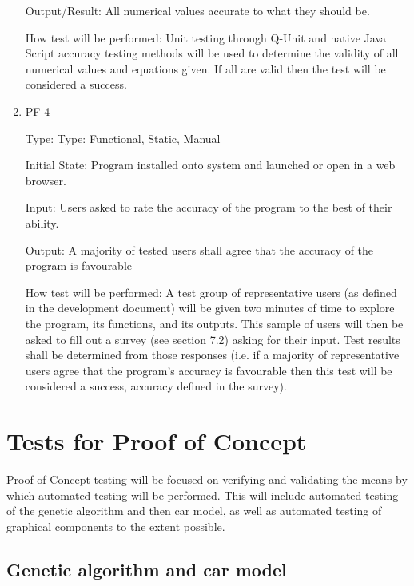 \documentclass[12pt, titlepage]{article}
\begin{document}
\begin{enumerate}
Output/Result: All numerical values accurate to what they should be.
					
How test will be performed: Unit testing through Q-Unit and native Java Script 
accuracy testing methods will be used to determine the validity of all numerical 
values and equations given. If all are valid then the test will be considered a 
success.


\item{PF-4\\}

Type: Type: Functional, Static, Manual
					
Initial State: Program installed onto system and launched or open in a web 
browser.
					
Input: Users asked to rate the accuracy of the program to the best of their 
ability.
					
Output: A majority of tested users shall agree that the accuracy of the program 
is favourable
					
 How test will be performed: A test group of representative users (as defined in 
the development document) will be given two minutes of time to explore the 
program, its functions, and its outputs. This sample of users will then be asked 
to fill out a survey (see section 7.2) asking for their input. Test results 
shall be determined from those responses (i.e. if a majority of representative 
users agree that the program's accuracy is favourable then this test will be 
considered a success, accuracy defined in the survey).

\end{enumerate}

\section{Tests for Proof of Concept}

Proof of Concept testing will be focused on verifying and validating the means 
by which automated testing will be performed. This will include automated 
testing of the genetic algorithm and then car model, as well as automated 
testing of graphical components to the extent possible.

\subsection{Genetic algorithm and car model}
\end{document}
